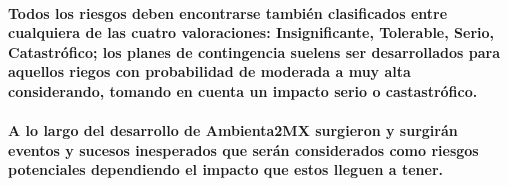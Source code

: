     \paragraph{Todos los riesgos deben encontrarse también clasificados entre cualquiera de las cuatro valoraciones: Insignificante, Tolerable, Serio, Catastrófico; los planes de contingencia suelens ser desarrollados para aquellos riegos con probabilidad de moderada a muy alta considerando, tomando en cuenta un impacto serio o castastrófico.}
    \paragraph{A lo largo del desarrollo de Ambienta2MX surgieron y surgirán eventos y sucesos inesperados que serán considerados como riesgos potenciales dependiendo el impacto que estos lleguen a tener.}
